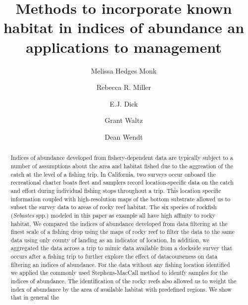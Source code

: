 \documentclass[
  12pt,
  authoryear,
  preprint,
  3p]{elsarticle}
\begin{document}
\begin{frontmatter}
\title{Methods to incorporate known habitat in indices of abundance an
applications to management}
\author[1]{Melissa Hedges Monk%
%
}
\author[2]{Rebecca R. Miller%
%
}
\author[1]{E.J. Dick%
%
}
\author[33]{Grant Waltz%
%
}
\author[3]{Dean Wendt%
%
}









        
\begin{abstract}
Indices of abundance developed from fishery-dependent data are typically
subject to a number of assumptions about the area and habitat fished due
to the aggreation of the catch at the level of a fishing trip. In
California, two surveys occur onboard the recreational charter boats
fleet and samplers record location-specific data on the catch and effort
during individual fishing stops throughout a trip. This location
specific information coupled with high-resolution maps of the bottom
substrate allowed us to subset the survey data to areas of rocky reef
habitat. The six species of rockfish (\emph{Sebastes} spp.) modeled in
this paper as example all have high affinity to rocky habitat. We
compared the indices of abundance developed from data filtering at the
finest scale of a fishing drop using the maps of rocky reef to filter
the data to the same data using only county of landing as an indicator
of location. In addition, we aggregated the data across a trip to mimic
data available from a dockside survey that occurs after a fishing trip
to further explore the effect of datacourseness on data filtering an
indices of abundance. For the data without any fishing location
identified we applied the commonly used Stephens-MacCall method to
identfy samples for the indices of abundance. The identification of the
rocky reefs also allowed us to weight the index of abundance by the area
of available habitat with predefined regions. We show that in general
the
\end{abstract}






\end{frontmatter}
\end{document}
